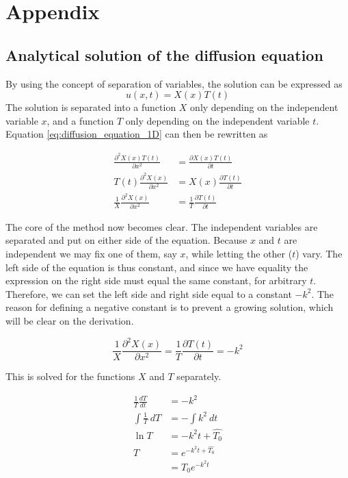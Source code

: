 \documentclass[12pt]{extarticle}
\begin{document}
\section{Appendix}

\subsection{Analytical solution of the diffusion equation} \label{app:1D_diff_eq}
By using the concept of separation of variables, the solution can be expressed as
\[ u(x,t) = X(x)T(t) \]
The solution is separated into a function $X$ only depending on the independent variable $x$, and a function $T$ only depending on the independent variable $t$. Equation \eqref{eq:diffusion_equation_1D} can then be rewritten as

\begin{align*}
	\frac{\partial^2 X(x)T(t)}{\partial x^2} &= \frac{\partial X(x)T(t)}{\partial t} \\
	T(t)\frac{\partial^2 X(x)}{\partial x^2} &= X(x)\frac{\partial T(t)}{\partial t} \\
	\frac{1}{X}\frac{\partial^2 X(x)}{\partial x^2} &= \frac{1}{T}\frac{\partial T(t)}{\partial t}
\end{align*}

The core of the method now becomes clear. The independent variables are separated and put on either side of the equation. Because $x$ and $t$ are independent we may fix one of them, say $x$, while letting the other ($t$) vary. The left side of the equation is thus constant, and since we have equality the expression on the right side must equal the same constant, for arbitrary $t$. Therefore, we can set the left side and right side equal to a constant $-k^2$. The reason for defining a negative constant is to prevent a growing solution, which will be clear on the derivation.

\[ \frac{1}{X}\frac{\partial^2 X(x)}{\partial x^2} = \frac{1}{T}\frac{\partial T(t)}{\partial t} = -k^2\]

This is solved for the functions $X$ and $T$ separately. 

\begin{align*}
	\frac{1}{T} \frac{dT}{dt} &= -k^2 \\
	\int \frac{1}{T}\:dT &= -\int k^2\:dt \\
	\ln T &= -k^2 t + \hat{T_0} \\
	T &= e^{-k^2t + \hat{T_0}} \\
	&= T_0 e^{-k^2t}
\end{align*}
\end{document}
